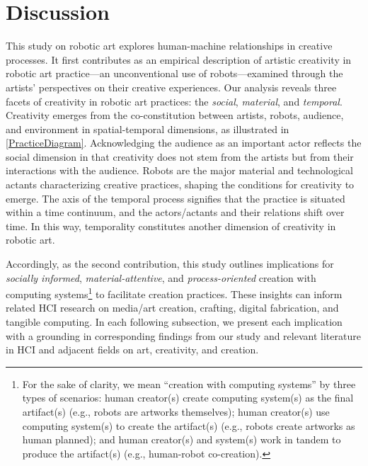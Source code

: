 \section{Discussion}

This study on robotic art explores human-machine relationships in creative processes.
It first contributes as an empirical description of artistic creativity in robotic art practice---an unconventional use of robots---examined through the artists' perspectives on their creative experiences. Our analysis reveals three facets of creativity in robotic art practices: the \textit{social}, \textit{material}, and \textit{temporal}. Creativity emerges from the co-constitution between artists, robots, audience, and environment in spatial-temporal dimensions, as illustrated in \autoref{PracticeDiagram}. Acknowledging the audience as an important actor reflects the social dimension in that creativity does not stem from the artists but from their interactions with the audience. Robots are the major material and technological actants characterizing creative practices, shaping the conditions for creativity to emerge. The axis of the temporal process signifies that the practice is situated within a time continuum, and the actors/actants and their relations shift over time. In this way, temporality constitutes another dimension of creativity in robotic art.

Accordingly, as the second contribution, this study outlines implications for \textit{socially informed}, \textit{material-attentive}, and \textit{process-oriented} creation with computing systems\footnote{For the sake of clarity, we mean ``creation with computing systems'' by three types of scenarios: human creator(s) create computing system(s) as the final artifact(s) (e.g., robots are artworks themselves); human creator(s) use computing system(s) to create the artifact(s) (e.g., robots create artworks as human planned); and human creator(s) and system(s) work in tandem to produce the artifact(s) (e.g., human-robot co-creation).} to facilitate creation practices. These insights can inform related HCI research on media/art creation, crafting, digital fabrication, and tangible computing.
In each following subsection, we present each implication with a grounding in corresponding findings from our study and relevant literature in HCI and adjacent fields on art, creativity, and creation.

